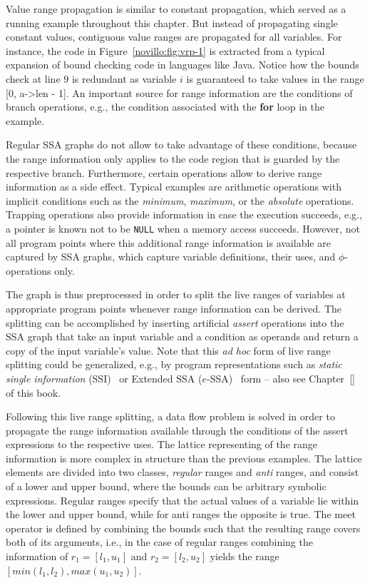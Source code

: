 Value range propagation is similar to constant propagation, which served as a
running example throughout this chapter. But instead of propagating single
constant values, contiguous value ranges are propagated for all variables. For
instance, the code in Figure~\ref{novillo:fig:vrp-1} is extracted from a
typical expansion of bound checking code in languages like Java. Notice how the
bounds check at line $9$ is redundant as variable $i$ is guaranteed to take
values in the range [$0$, a-\textgreater len - 1]. An important source for range
information are the conditions of branch operations, e.g., the condition
associated with the \textbf{for} loop in the example.

Regular SSA graphs do not allow to take advantage of these conditions, because
the range information only applies to the code region that is guarded by the
respective branch. Furthermore, certain operations allow to derive range
information as a side effect. Typical examples are arithmetic operations with
implicit conditions such as the \emph{minimum}, \emph{maximum}, or the
\emph{absolute} operations. Trapping operations also provide information in case
the execution succeeds, e.g., a pointer is known not to be \texttt{NULL} when a
memory access succeeds. However, not all program points where this additional
range information is available are captured by SSA graphs, which capture
variable definitions, their uses, and $\phi$-operations only.

The graph is thus preprocessed in order to split the live ranges of variables
at appropriate program points whenever range information can be derived. The
splitting can be accomplished by inserting artificial \emph{assert} operations
into the SSA graph that take an input variable and a condition as operands and
return a copy of the input variable's value. Note that this \emph{ad hoc} form
of live range splitting could be generalized, e.g., by program representations
such as \emph{static single information}
(SSI)~\cite{novillo:bib:A99,novillo:bib:S05} or Extended SSA
($e$-SSA)~\cite{novillo:bib:BGV00} form -- also see Chapter~\ref{} of this
book. 

Following this live range splitting, a data flow problem is solved in order to
propagate the range information available through the conditions of the assert
expressions to the respective uses. The lattice representing of the range
information is more complex in structure than the previous examples. The lattice
elements are divided into two classes, \emph{regular} ranges and \emph{anti}
ranges, and consist of a lower and upper bound, where the bounds can be
arbitrary symbolic expressions. Regular ranges specify that the actual values of
a variable lie within the lower and upper bound, while for anti ranges the
opposite is true. The meet operator is defined by combining the bounds such that
the resulting range covers both of its arguments, i.e., in the case of regular
ranges combining the information of $r_1 = [l_1, u_1]$ and $r_2 = [l_2, u_2]$
yields the range $[min(l_1, l_2), max(u_1, u_2)]$.

